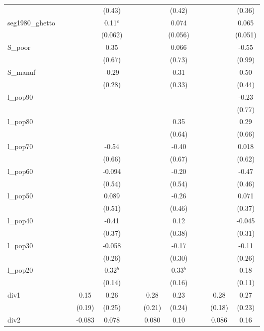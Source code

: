 \documentclass[]{article}
\begin{document}
\begin{tabular}{lcccccccccccc}
 &  &  &  & (0.43) &  &  &  & (0.42) &  &  &  & (0.36) \\
seg1980\_ghetto &  &  &  & 0.11$^c$ &  &  &  & 0.074 &  &  &  & 0.065 \\
 &  &  &  & (0.062) &  &  &  & (0.056) &  &  &  & (0.051) \\
S\_poor &  &  &  & 0.35 &  &  &  & 0.066 &  &  &  & -0.55 \\
 &  &  &  & (0.67) &  &  &  & (0.73) &  &  &  & (0.99) \\
S\_manuf &  &  &  & -0.29 &  &  &  & 0.31 &  &  &  & 0.50 \\
 &  &  &  & (0.28) &  &  &  & (0.33) &  &  &  & (0.44) \\
l\_pop90 &  &  &  &  &  &  &  &  &  &  &  & -0.23 \\
 &  &  &  &  &  &  &  &  &  &  &  & (0.77) \\
l\_pop80 &  &  &  &  &  &  &  & 0.35 &  &  &  & 0.29 \\
 &  &  &  &  &  &  &  & (0.64) &  &  &  & (0.66) \\
l\_pop70 &  &  &  & -0.54 &  &  &  & -0.40 &  &  &  & 0.018 \\
 &  &  &  & (0.66) &  &  &  & (0.67) &  &  &  & (0.62) \\
l\_pop60 &  &  &  & -0.094 &  &  &  & -0.20 &  &  &  & -0.47 \\
 &  &  &  & (0.54) &  &  &  & (0.54) &  &  &  & (0.46) \\
l\_pop50 &  &  &  & 0.089 &  &  &  & -0.26 &  &  &  & 0.071 \\
 &  &  &  & (0.51) &  &  &  & (0.46) &  &  &  & (0.37) \\
l\_pop40 &  &  &  & -0.41 &  &  &  & 0.12 &  &  &  & -0.045 \\
 &  &  &  & (0.37) &  &  &  & (0.38) &  &  &  & (0.31) \\
l\_pop30 &  &  &  & -0.058 &  &  &  & -0.17 &  &  &  & -0.11 \\
 &  &  &  & (0.26) &  &  &  & (0.30) &  &  &  & (0.26) \\
l\_pop20 &  &  &  & 0.32$^b$ &  &  &  & 0.33$^b$ &  &  &  & 0.18 \\
 &  &  &  & (0.14) &  &  &  & (0.16) &  &  &  & (0.11) \\
div1 &  &  & 0.15 & 0.26 &  &  & 0.28 & 0.23 &  &  & 0.28 & 0.27 \\
 &  &  & (0.19) & (0.25) &  &  & (0.21) & (0.24) &  &  & (0.18) & (0.23) \\
div2 &  &  & -0.083 & 0.078 &  &  & 0.080 & 0.10 &  &  & 0.086 & 0.16 \\

\end{tabular}
\end{document}
